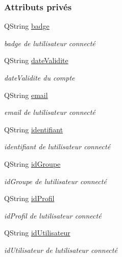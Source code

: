 \subsubsection*{Attributs privés}
\begin{DoxyCompactItemize}
\item 
Q\+String \hyperlink{class_utilisateur_a77b48aa9d1f0ec04c69d45476897fec6}{badge}
\begin{DoxyCompactList}\small\item\em badge de l\textquotesingle{}utilisateur connecté \end{DoxyCompactList}\item 
Q\+String \hyperlink{class_utilisateur_a898cd6f5a64d733ad49a8a74388326cd}{date\+Validite}
\begin{DoxyCompactList}\small\item\em date\+Validite du compte \end{DoxyCompactList}\item 
Q\+String \hyperlink{class_utilisateur_a2f45443ce5277a5e6baefe5121e66555}{email}
\begin{DoxyCompactList}\small\item\em email de l\textquotesingle{}utilisateur connecté \end{DoxyCompactList}\item 
Q\+String \hyperlink{class_utilisateur_a1e79e47202a2c716346f47adbbeb2511}{identifiant}
\begin{DoxyCompactList}\small\item\em identifiant de l\textquotesingle{}utilisateur connecté \end{DoxyCompactList}\item 
Q\+String \hyperlink{class_utilisateur_a13c3425772da1d5501e6fe4a2f2b8194}{id\+Groupe}
\begin{DoxyCompactList}\small\item\em id\+Groupe de l\textquotesingle{}utilisateur connecté \end{DoxyCompactList}\item 
Q\+String \hyperlink{class_utilisateur_a042947e8b86637d1eb012c3fc89a959e}{id\+Profil}
\begin{DoxyCompactList}\small\item\em id\+Profil de l\textquotesingle{}utilisateur connecté \end{DoxyCompactList}\item 
Q\+String \hyperlink{class_utilisateur_ae1763e7a52c82c63506bc4160cdabb20}{id\+Utilisateur}
\begin{DoxyCompactList}\small\item\em id\+Utilisateur de l\textquotesingle{}utilisateur connecté \end{DoxyCompactList}\item 

\end{DoxyCompactItemize}
